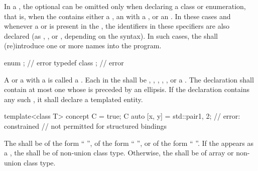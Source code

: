 \pnum
{}%
%
In a , the optional
 can be omitted only when declaring a
class or enumeration, that is,
when the  contains either a
, an  with
a , or an
. In these cases and whenever a
 or  is present in
the , the identifiers in these specifiers
are also declared (as
, , or
, depending on the syntax). In such cases,
the  shall (re)introduce one or more names into
the program.
\begin{example}
\begin{codeblock}
enum { };           // error
typedef class { };  // error
\end{codeblock}
\end{example}

\pnum
A  or a 
with a  is called
a .
Each  in the 
shall be
,
,
,
,
, or
a .
The declaration shall contain at most one 
whose  is preceded by an ellipsis.
If the declaration contains any such ,
it shall declare a templated entity.
\begin{example}
\begin{codeblock}
template<class T> concept C = true;
C auto [x, y] = std::pair{1, 2};    // error: constrained 
                                    // not permitted for structured bindings
\end{codeblock}
\end{example}
The  shall be
of the form ``\tcode{=} '',
of the form ``\tcode{\{}  \tcode{\}}'',
or
of the form ``\tcode{(}  \tcode{)}''.
If the  appears as
a ,
the  shall be of non-union class type.
Otherwise,
the  shall be of
array or non-union class type.


